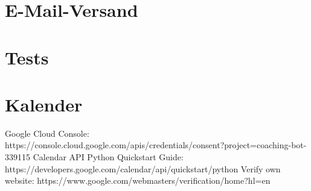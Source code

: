 \section{E-Mail-Versand}


\section{Tests}



\section{}

\section{}

\section{}

\section{}

\section{}



\section{Kalender}

Google Cloud Console: https://console.cloud.google.com/apis/credentials/consent?project=coaching-bot-339115 
Calendar API Python Quickstart Guide: https://developers.google.com/calendar/api/quickstart/python 
Verify own website: https://www.google.com/webmasters/verification/home?hl=en